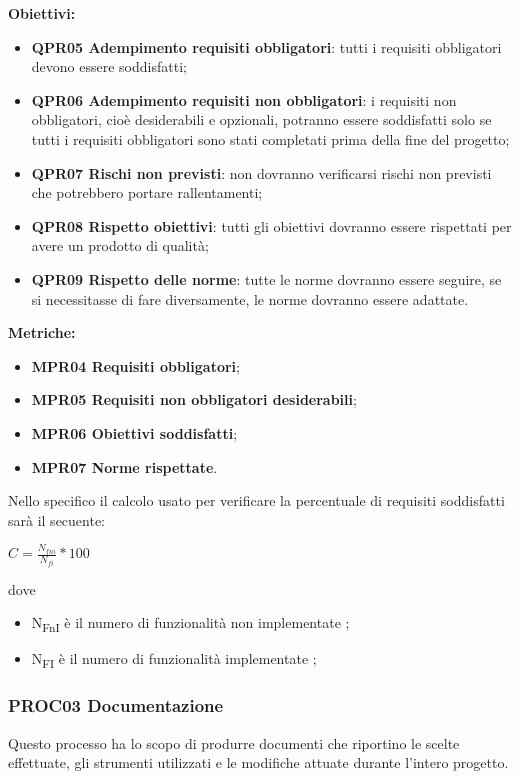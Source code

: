 \documentclass[../piano_di_qualifica.tex]{subfiles}
\begin{document}
\textbf{Obiettivi:}
\smallbreak
\begin{itemize}
	\item \textbf{QPR05 Adempimento requisiti obbligatori}: tutti i requisiti obbligatori devono essere soddisfatti;
	\item \textbf{QPR06 Adempimento requisiti non obbligatori}: i requisiti non obbligatori, cioè desiderabili e opzionali, potranno essere soddisfatti solo se tutti i requisiti obbligatori sono stati completati prima della fine del progetto;
	\item \textbf{QPR07 Rischi non previsti}: non dovranno verificarsi rischi non previsti che potrebbero portare rallentamenti;
	\item \textbf{QPR08 Rispetto obiettivi}: tutti gli obiettivi dovranno essere rispettati per avere un prodotto di qualità;
	\item \textbf{QPR09 Rispetto delle norme}: tutte le norme dovranno essere seguire, se si necessitasse di fare diversamente, le norme dovranno essere adattate.
\end{itemize}

\textbf{Metriche:}
\smallbreak
\begin{itemize}
	\item \textbf{MPR04 Requisiti obbligatori};
	\item \textbf{MPR05 Requisiti non obbligatori desiderabili};
	\item \textbf{MPR06 Obiettivi soddisfatti};
	\item \textbf{MPR07 Norme rispettate}.
\end{itemize}

Nello specifico il calcolo usato per verificare la percentuale di requisiti soddisfatti sarà il secuente: \par
\begin{center}
	$C = \frac{N_{fni}}{N_{fi}} * 100$
\end{center}

dove
\begin{itemize}
\item N\textsubscript{FnI} è il numero di funzionalità non implementate ;
\item N\textsubscript{FI} è il numero di funzionalità implementate ;
\end{itemize}

\subsubsection{PROC03 Documentazione}
Questo processo ha lo scopo di produrre documenti che riportino le scelte effettuate, gli strumenti utilizzati e le modifiche attuate durante l'intero progetto.
\end{document}
